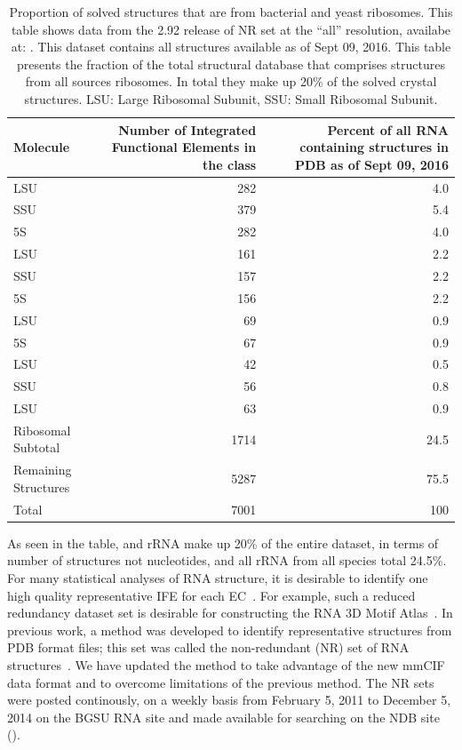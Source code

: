 \begin{table}
  \begin{tabulary}{\linewidth}{LRR}
    \toprule
    Molecule &
      Number of Integrated Functional Elements in the class &
      Percent of all RNA containing structures in PDB as of Sept 09, 2016 \\
    \midrule
    \TT{} LSU            & 282  & 4.0  \\
    \TT{} SSU            & 379  & 5.4  \\
    \TT{} 5S             & 282  & 4.0  \\
    \EC{} LSU            & 161  & 2.2  \\
    \EC{} SSU            & 157  & 2.2  \\
    \EC{} 5S             & 156  & 2.2  \\
    \HM{} LSU            & 69   & 0.9  \\
    \HM{} 5S             & 67   & 0.9  \\
    \DR{} LSU            & 42   & 0.5  \\
    \SC{} SSU            & 56   & 0.8  \\
    \SC{} LSU            & 63   & 0.9  \\
    Ribosomal Subtotal   & 1714 & 24.5 \\
    Remaining Structures & 5287 & 75.5 \\
    Total                & 7001 & 100  \\
    \bottomrule
  \end{tabulary}
  \caption{Proportion of solved structures that are from bacterial and yeast
    ribosomes. This table shows data from the 2.92 release of NR set at the
    ``all'' resolution, availabe at:
    . This dataset contains
    all structures available as of Sept 09, 2016. This table presents the
    fraction of the total structural database that comprises structures from all
    sources ribosomes. In total they make up 20\% of the solved crystal
  structures. LSU: Large Ribosomal Subunit, SSU: Small Ribosomal Subunit.}
\label{tab:mol-dist}
\end{table}

As seen in the table, \EC{} and \TT{} rRNA make up 20\% of the entire dataset,
in terms of number of structures not nucleotides, and all rRNA from all species
total 24.5\%. For many statistical analyses of RNA structure, it is desirable to
identify one high quality representative IFE for each EC~\cite{Leontis2012b}.
For example, such a reduced redundancy dataset set is desirable for constructing
the RNA 3D Motif Atlas~\cite{Petrov2013}. In previous work, a method was
developed to identify representative structures from PDB format files; this set
was called the non-redundant (NR) set of RNA structures~\cite{Leontis2012b}. We
have updated the method to take advantage of the new mmCIF data format and to
overcome limitations of the previous method. The NR sets were posted
continously, on a weekly basis from February 5, 2011 to December 5, 2014 on the
BGSU RNA site and made available for searching on the NDB site
().


